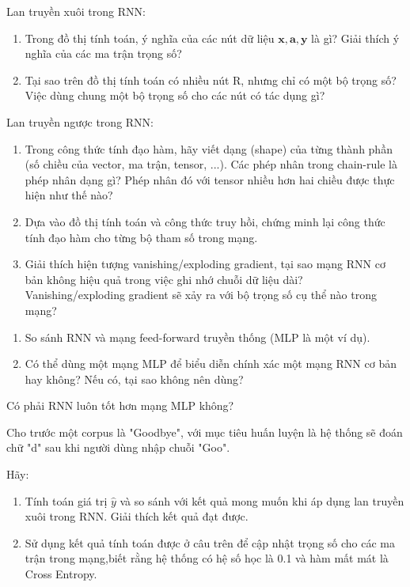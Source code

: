 \clearpage
\begin{exer}
Lan truyền xuôi trong RNN:
    \begin{enumerate}[label=\alph*)]
    \item Trong đồ thị tính toán, ý nghĩa của các nút dữ liệu $\bm x, \bm a, \bm y$ là gì? Giải thích ý nghĩa của các ma trận trọng số?
    \item Tại sao trên đồ thị tính toán có nhiều nút R, nhưng chỉ có một bộ trọng số? Việc dùng chung một bộ trọng số cho các nút có tác dụng gì?
    \end{enumerate}
\end{exer}

\begin{exer}
Lan truyền ngược trong RNN:
    \begin{enumerate}[label=\alph*)]
    \item Trong công thức tính đạo hàm, hãy viết dạng (shape) của từng thành phần (số chiều của vector, ma trận, tensor, ...). Các phép nhân trong chain-rule là phép nhân dạng gì? 
    Phép nhân đó với tensor nhiều hơn hai chiều được thực hiện như thế nào?
    \item Dựa vào đồ thị tính toán và công thức truy hồi, chứng minh lại công thức tính đạo hàm cho từng bộ tham số trong mạng.
    \item Giải thích hiện tượng vanishing/exploding gradient, tại sao mạng RNN cơ bản không hiệu quả trong việc ghi nhớ chuỗi dữ liệu dài? Vanishing/exploding gradient sẽ xảy ra với bộ trọng số cụ thể nào trong mạng?
    \end{enumerate}
\end{exer}

\begin{exer}
\leavevmode
    \begin{enumerate}[label=\alph*)]
    \item So sánh RNN và mạng feed-forward truyền thống (MLP là một ví dụ).
    \item Có thể dùng một mạng MLP để biểu diễn chính xác một mạng RNN cơ bản hay không? Nếu có, tại sao không nên dùng?
    \end{enumerate}
\end{exer}

\begin{exer}
Có phải RNN luôn tốt hơn mạng MLP không?
\end{exer}

\clearpage
\begin{exer}
Cho trước một corpus là "Goodbye", với mục tiêu huấn luyện là hệ thống sẽ đoán chữ "d" sau khi người dùng nhập chuỗi "Goo". 

Hãy:
    \begin{enumerate}[label=\alph*)]
    \item Tính toán giá trị $\widehat{y}$ và so sánh với kết quả mong muốn khi áp dụng lan truyền xuôi trong RNN. Giải thích kết quả đạt được.
    \item Sử dụng kết quả tính toán được ở câu trên để cập nhật trọng số cho các ma trận trong mạng,biết rằng hệ thống có hệ số học là 0.1 và hàm mất mát là Cross Entropy.
    \end{enumerate}
\end{exer}